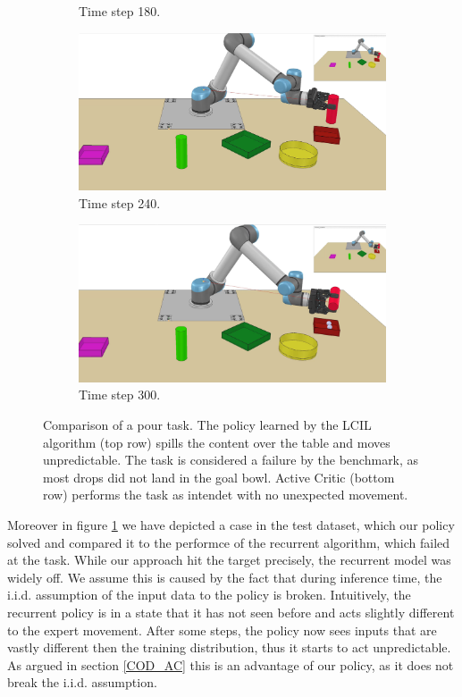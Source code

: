 \begin{figure}
\begin{subfigure}[t]{0.18\textwidth}
        \caption{Time step 180.}
    \end{subfigure}
    \begin{subfigure}[t]{0.18\textwidth}
        \includegraphics[width=\linewidth]{images/Language_Conditioned_Exp/mine_4.png}
        \caption{Time step 240.}
    \end{subfigure}
    \begin{subfigure}[t]{0.18\textwidth}
        \includegraphics[width=\linewidth]{images/Language_Conditioned_Exp/mine_5.png}
        \caption{Time step 300.}
    \end{subfigure}
    \caption{Comparison of a pour task. The policy learned by the LCIL algorithm (top row) spills the content over the table and moves unpredictable. The task is considered a failure 
    by the benchmark, as most drops did not land in the goal bowl. Active Critic (bottom row) performs the task as intendet with no unexpected movement.}
    \label{fig: AC vs. Rec}
\end{figure}
Moreover in figure \ref{fig: AC vs. Rec} we have depicted a case in the test dataset, which our policy solved and compared it to the performce of the recurrent algorithm, which failed at the task. 
While our approach hit the target precisely, the recurrent model was widely off. We assume this is caused by the fact that during inference time, the 
i.i.d. assumption of the input data to the policy is broken. Intuitively, the recurrent policy 
is in a state that it has not seen before and acts slightly different to the expert movement. After some steps, the policy now sees inputs that are vastly 
different then the training distribution, thus it starts to act unpredictable. As argued in section \ref{COD_AC} this is an advantage of our policy, as it 
does not break the i.i.d. assumption.

